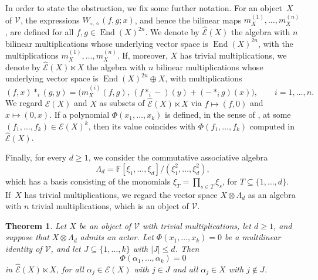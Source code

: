 \documentclass[reqno,a4paper]{amsart}
\theoremstyle{plain}
\newtheorem{theorem}[subsection]{Theorem}
\theoremstyle{definition}
\theoremstyle{remark}
\numberwithin{equation}{section}
\newcommand{\F}{\mathbb{F}}
\newcommand{\E}{\mathcal{E}}
\newcommand{\V}{\mathcal{V}}
\DeclareMathOperator{\End}{End}
\begin{document}
In order to state the obstruction, we fix some further notation. For an object~$X$ of $\V$, the expressions $W_{\circ,\diamond}(f,g;x)$, and hence the bilinear maps $m_X^{(1)},\ldots,m_X^{(n)}$, are defined for all $f,g\in\End(X)^{2n}$. We denote by $\widehat{\E}(X)$ the algebra with $n$ bilinear multiplications whose underlying vector space is $\End(X)^{2n}$, with the multiplications $m_X^{(1)},\ldots,m_X^{(n)}$. If, moreover, $X$ has trivial multiplications, we denote by $\widehat{\E}(X)\ltimes X$ the algebra with $n$ bilinear multiplications whose underlying vector space is $\End(X)^{2n}\oplus X$, with multiplications
\[
(f,x)\ast_i(g,y)=\bigl(m_X^{(i)}(f,g),\,(f\ast_i-)(y)+(-\ast_ig)(x)\bigr),
\qquad i=1,\ldots,n.
\]
We regard $\E(X)$ and $X$ as subsets of $\widehat{\E}(X)\ltimes X$ via $f\mapsto(f,0)$ and $x\mapsto(0,x)$. If a polynomial $\Phi(x_1,\ldots,x_k)$ is defined, in the sense of , at some $(f_1,\ldots,f_k)\in\E(X)^k$, then its value coincides with $\Phi(f_1,\ldots,f_k)$ computed in $\widehat{\E}(X)$.

Finally, for every $d\geq1$, we consider the commutative associative algebra
\[
\Lambda_d=\F[\xi_1,\ldots,\xi_d]/(\xi_1^2,\ldots,\xi_d^2),
\]
which has a basis consisting of the monomials $\xi_T=\prod_{s\in T}\xi_s$, for $T\subseteq\{1,\ldots,d\}$. If~$X$ has trivial multiplications, we regard the vector space $X\otimes\Lambda_d$ as an algebra with $n$ trivial multiplications, which is an object of $\V$.

\begin{theorem}\label{ThmTensorObstruction}
Let $X$ be an object of $\V$ with trivial multiplications, let $d\geq1$, and suppose that $X\otimes\Lambda_d$ admits an actor. Let $\Phi(x_1,\ldots,x_k)=0$ be a multilinear identity of $\V$, and let $J\subseteq\{1,\ldots,k\}$ with $|J|\leq d$. Then
\[
\Phi(\alpha_1,\ldots,\alpha_k)=0
\]
in $\widehat{\E}(X)\ltimes X$, for all $\alpha_j\in\E(X)$ with $j\in J$ and all $\alpha_j\in X$ with $j\notin J$.
\end{theorem}
\end{document}
